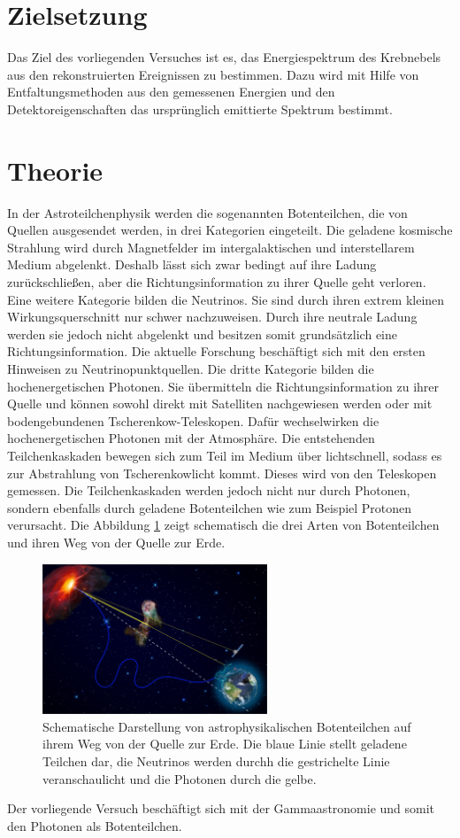 \section{Zielsetzung}
Das Ziel des vorliegenden Versuches ist es, das Energiespektrum des Krebnebels aus den rekonstruierten Ereignissen zu bestimmen. Dazu wird mit Hilfe von Entfaltungsmethoden aus den gemessenen Energien und den Detektoreigenschaften das ursprünglich emittierte Spektrum bestimmt.
\section{Theorie}
In der Astroteilchenphysik werden die sogenannten Botenteilchen, die von Quellen ausgesendet werden, in drei Kategorien eingeteilt. Die geladene kosmische Strahlung wird durch Magnetfelder im intergalaktischen und interstellarem Medium abgelenkt. Deshalb lässt sich zwar bedingt auf ihre Ladung zurückschließen, aber die Richtungsinformation zu ihrer Quelle geht verloren. Eine weitere Kategorie bilden die Neutrinos. Sie sind durch ihren extrem kleinen Wirkungsquerschnitt nur schwer nachzuweisen. Durch ihre neutrale Ladung werden sie jedoch nicht abgelenkt und besitzen somit grundsätzlich eine Richtungsinformation. Die aktuelle Forschung beschäftigt sich mit den ersten Hinweisen zu Neutrinopunktquellen. Die dritte Kategorie bilden die hochenergetischen Photonen. Sie übermitteln die Richtungsinformation zu ihrer Quelle und können sowohl direkt mit Satelliten nachgewiesen werden oder mit bodengebundenen Tscherenkow-Teleskopen. Dafür wechselwirken die hochenergetischen Photonen mit der Atmosphäre. Die entstehenden Teilchenkaskaden bewegen sich zum Teil im Medium über lichtschnell, sodass es zur Abstrahlung von Tscherenkowlicht kommt. Dieses wird von den Teleskopen gemessen. Die Teilchenkaskaden werden jedoch nicht nur durch Photonen, sondern ebenfalls durch geladene Botenteilchen wie zum Beispiel Protonen verursacht. Die Abbildung \ref{fig:Boten} zeigt schematisch die drei Arten von Botenteilchen und ihren Weg von der Quelle zur Erde.\\
\begin{figure}
  \centering
  \includegraphics[width=0.6\textwidth]{graphics/Folie5.png}
  \caption{Schematische Darstellung von astrophysikalischen Botenteilchen auf ihrem Weg von der Quelle zur Erde. Die blaue Linie stellt geladene Teilchen dar, die Neutrinos werden durchh die gestrichelte Linie veranschaulicht und die Photonen durch die gelbe.\cite{anleitung}}
  \label{fig:Boten}
\end{figure}
Der vorliegende Versuch beschäftigt sich mit der Gammaastronomie und somit den Photonen als Botenteilchen.
